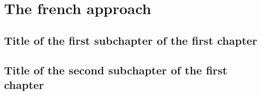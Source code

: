 \chapter{The french approach}


\section{Title of the first subchapter of the first chapter}

\section{Title of the second subchapter of the first chapter}

